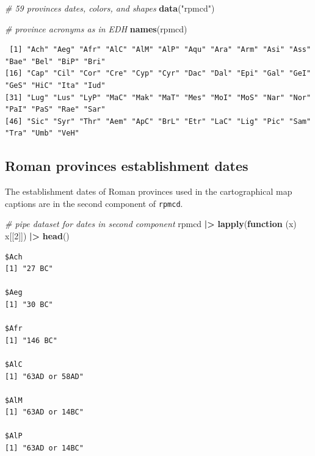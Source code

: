 \documentclass[a4paper,11pt]{memoir}
\newenvironment{Shaded}{\begin{snugshade}}{\end{snugshade}}
\newcommand{\CommentTok}[1]{\textcolor[rgb]{0.56,0.35,0.01}{\textit{#1}}}
\newcommand{\ControlFlowTok}[1]{\textcolor[rgb]{0.13,0.29,0.53}{\textbf{#1}}}
\newcommand{\DecValTok}[1]{\textcolor[rgb]{0.00,0.00,0.81}{#1}}
\newcommand{\ErrorTok}[1]{\textcolor[rgb]{0.64,0.00,0.00}{\textbf{#1}}}
\newcommand{\KeywordTok}[1]{\textcolor[rgb]{0.13,0.29,0.53}{\textbf{#1}}}
\newcommand{\NormalTok}[1]{#1}
\newcommand{\OperatorTok}[1]{\textcolor[rgb]{0.81,0.36,0.00}{\textbf{#1}}}
\newcommand{\StringTok}[1]{\textcolor[rgb]{0.31,0.60,0.02}{#1}}
\begin{document}
\begin{Shaded}
\begin{Highlighting}[]
\CommentTok{# 59 provinces dates, colors, and shapes}
\KeywordTok{data}\NormalTok{(}\StringTok{"rpmcd"}\NormalTok{)}

\CommentTok{# province acronyms as in EDH}
\KeywordTok{names}\NormalTok{(rpmcd)}
\end{Highlighting}
\end{Shaded}

\begin{verbatim}
 [1] "Ach" "Aeg" "Afr" "AlC" "AlM" "AlP" "Aqu" "Ara" "Arm" "Asi" "Ass" "Bae" "Bel" "BiP" "Bri"
[16] "Cap" "Cil" "Cor" "Cre" "Cyp" "Cyr" "Dac" "Dal" "Epi" "Gal" "GeI" "GeS" "HiC" "Ita" "Iud"
[31] "Lug" "Lus" "LyP" "MaC" "Mak" "MaT" "Mes" "MoI" "MoS" "Nar" "Nor" "PaI" "PaS" "Rae" "Sar"
[46] "Sic" "Syr" "Thr" "Aem" "ApC" "BrL" "Etr" "LaC" "Lig" "Pic" "Sam" "Tra" "Umb" "VeH"
\end{verbatim}

\hypertarget{roman-provinces-establishment-dates}{%
\subsection{Roman provinces establishment
dates}\label{roman-provinces-establishment-dates}}

The establishment dates of Roman provinces used in the cartographical
map captions are in the second component of \texttt{rpmcd}.

\begin{Shaded}
\begin{Highlighting}[]
\CommentTok{# pipe dataset for dates in second component}
\NormalTok{rpmcd }\OperatorTok{|}\ErrorTok{>}\StringTok{ }
\StringTok{  }\KeywordTok{lapply}\NormalTok{(}\ControlFlowTok{function}\NormalTok{ (x) x[[}\DecValTok{2}\NormalTok{]]) }\OperatorTok{|}\ErrorTok{>}\StringTok{ }
\StringTok{  }\KeywordTok{head}\NormalTok{()}
\end{Highlighting}
\end{Shaded}

\begin{verbatim}
$Ach
[1] "27 BC"

$Aeg
[1] "30 BC"

$Afr
[1] "146 BC"

$AlC
[1] "63AD or 58AD"

$AlM
[1] "63AD or 14BC"

$AlP
[1] "63AD or 14BC"
\end{verbatim}
\end{document}
